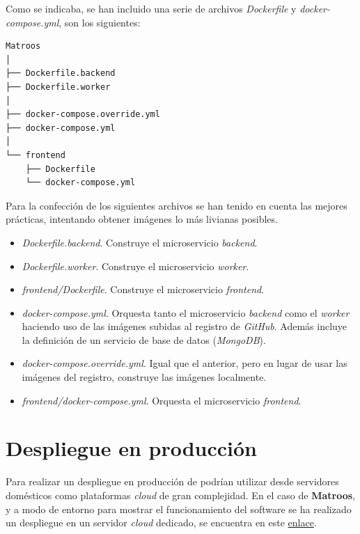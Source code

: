 Como se indicaba, se han incluido una serie de archivos \textit{Dockerfile} y \textit{docker-compose.yml}, son los siguientes:

\begin{lstlisting}[style=tree]
Matroos
│
├── Dockerfile.backend
├── Dockerfile.worker
│
├── docker-compose.override.yml
├── docker-compose.yml
│
└── frontend
    ├── Dockerfile
    └── docker-compose.yml
\end{lstlisting}

Para la confección de los siguientes archivos se han tenido en cuenta las mejores prácticas, intentando obtener imágenes lo más livianas posibles.

\begin{itemize}
	\item \textit{Dockerfile.backend}. Construye el microservicio \textit{backend}.
	\item \textit{Dockerfile.worker}. Construye el microservicio \textit{worker}.
	\item \textit{frontend/Dockerfile}. Construye el microservicio \textit{frontend}.
\end{itemize}

\begin{itemize}
	\item \textit{docker-compose.yml}. Orquesta tanto el microservicio \textit{backend} como el \textit{worker} haciendo uso de las imágenes subidas al registro de \textit{GitHub}. Además incluye la definición de un servicio de base de datos (\textit{MongoDB}).
	\item \textit{docker-compose.override.yml}. Igual que el anterior, pero en lugar de usar las imágenes del registro, construye las imágenes localmente.
	\item \textit{frontend/docker-compose.yml}. Orquesta el microservicio \textit{frontend}.
\end{itemize}


\section{Despliegue en producción}

Para realizar un despliegue en producción de podrían utilizar desde servidores domésticos como plataformas \textit{cloud} de gran complejidad. En el caso de \textbf{Matroos}, y a modo de entorno para mostrar el funcionamiento del software se ha realizado un despliegue en un servidor \textit{cloud} dedicado, se encuentra en este \href{https://0xhc.com:9000/}{enlace}.

